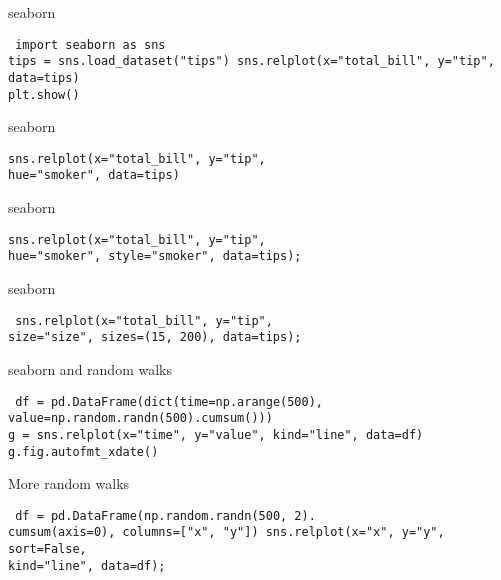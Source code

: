 \begin{frame}{seaborn}

  {\tt
    import seaborn as sns \\[4mm]
    tips = sns.load\_dataset("tips")
    sns.relplot(x="total\_bill", y="tip", data=tips)\\[2mm]
    plt.show()
  }
\end{frame}

\begin{frame}{seaborn}
  
  {\tt sns.relplot(x="total\_bill", y="tip", \\
    \hspace{1cm} hue="smoker", data=tips)}
\end{frame}

\begin{frame}{seaborn}
  
  {\tt sns.relplot(x="total\_bill", y="tip",\\
    \hspace{1cm} hue="smoker", style="smoker",
    data=tips);
  }
\end{frame}

\begin{frame}{seaborn}

  {\tt
    sns.relplot(x="total\_bill", y="tip",\\
    \hspace{1cm} size="size", sizes=(15, 200), data=tips);
  }
\end{frame}

\begin{frame}{seaborn and random walks}

  {\tt
    df = pd.DataFrame(dict(time=np.arange(500),\\
        \hspace{2cm} value=np.random.randn(500).cumsum()))\\
    g = sns.relplot(x="time", y="value", kind="line", data=df)\\
    g.fig.autofmt\_xdate()\\
  }
\end{frame}

\begin{frame}{More random walks}

  {\tt
    df = pd.DataFrame(np.random.randn(500, 2).\\
    \hspace{1cm} cumsum(axis=0), columns=["x", "y"])
    sns.relplot(x="x", y="y", sort=False, \\
    \hspace{1cm} kind="line", data=df);
  }
\end{frame}

